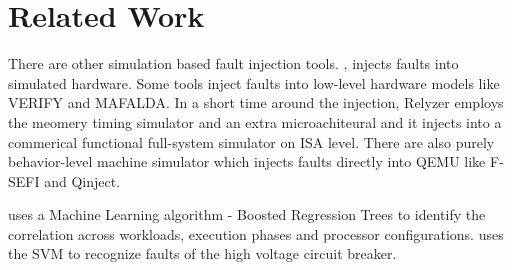 \section{Related Work}
There are other simulation based fault injection tools. \cite{Benso:2010:FIT:1965156}, \cite{6850649} injects faults into simulated hardware. Some tools inject faults into low-level hardware models like VERIFY\cite{614074} and MAFALDA\cite{Arlat:2002:DCM:506792.506796}. In a short time around the injection, Relyzer\cite{Hari:2012:REA:2248487.2150990} employs the meomery timing simulator and an extra microachiteural and it injects into a commerical functional full-system simulator on ISA level. There are also purely behavior-level machine simulator which injects faults directly into QEMU\cite{Bellard:2005:QFP:1247360.1247401} like F-SEFI\cite{6877352} and Qinject\cite{david2008qinject}.

\cite{4798244} uses a Machine Learning algorithm - Boosted Regression Trees to identify the correlation across workloads, execution phases and processor configurations. \cite{7757917} uses the SVM to recognize faults of the high voltage circuit breaker.